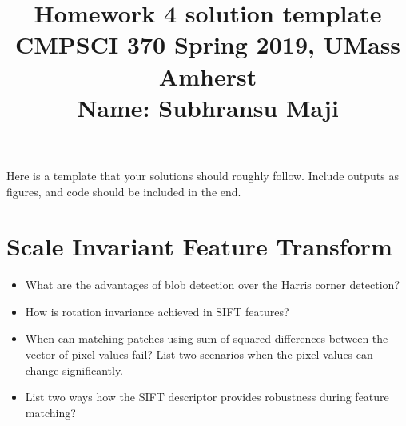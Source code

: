 \documentclass[10pt,letterpaper]{article}
\title{
  Homework 4 solution template\\
  \Large{CMPSCI 370 Spring 2019, UMass Amherst} \\
  \Large{Name: Subhransu Maji} \\
}
\date{}
\begin{document}
\maketitle

\renewcommand\thesubsection{\thesection.\alph{subsection}}

Here is a template that your solutions should roughly follow. Include outputs as figures, and code should be included in the end.


\section{Scale Invariant Feature Transform}
\begin{itemize}
\item What are the advantages of  blob detection over the Harris corner detection?
\vspace{1.in}

\item How is rotation invariance achieved in SIFT features?
\vspace{1.in}

\item When can matching patches using sum-of-squared-differences between the vector of pixel values fail? List two scenarios when the pixel values can change significantly.
\vspace{1.in}

\item List two ways how the SIFT descriptor provides robustness during feature matching?
\vspace{1.in}
\end{itemize}
\newpage
\end{document}
